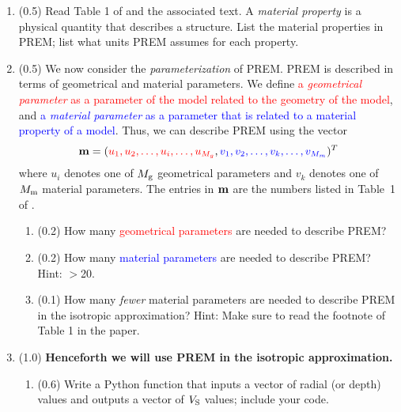 \documentclass[11pt,titlepage,fleqn]{article}
\begin{document}
\begin{enumerate}

\item (0.5) Read Table 1 of \citet{PREM} and the associated text. A {\em material property} is a physical quantity that describes a structure. List the material properties in PREM; list what units PREM assumes for each property.


\item (0.5) We now consider the {\em parameterization} of PREM. PREM is described in terms of geometrical and material parameters.
We define \textcolor{red}{a {\em geometrical parameter} as a parameter of the model related to the geometry of the model},
and \textcolor{blue}{a {\em material parameter} as a parameter that is related to a material property of a model}.
Thus, we can describe PREM using the vector
%
\begin{equation}
\mbox{${\bf m}$} = (\textcolor{red}{u_1, u_2, \ldots, u_i, \ldots, u_{M_g}},
\textcolor{blue}{v_1, v_2, \ldots, v_k, \ldots, v_{M_m}})^T
\label{bem}
\end{equation}
%
where $u_i$ denotes one of $M_{\rm g}$ geometrical parameters and $v_k$ denotes one of $M_{\rm m}$ material parameters.
The entries in $\mbox{${\bf m}$}$ are the numbers listed in Table~1 of \citet{PREM}.

\begin{enumerate}
\item (0.2) How many \textcolor{red}{geometrical parameters} are needed to describe PREM?
\item (0.2) How many \textcolor{blue}{material parameters} are needed to describe PREM? Hint: $>$20.
\item (0.1) How many {\em fewer} material parameters are needed to describe PREM in the isotropic approximation? Hint: Make sure to read the footnote of Table 1 in the paper.
\end{enumerate}



\item (1.0) {\bf Henceforth we will use PREM in the isotropic approximation.}


\begin{enumerate}
\item (0.6) Write a Python function that inputs a vector of radial (or depth) values and outputs a vector of $V_{\rm S}$ values; include your code.


\end{enumerate}
\end{enumerate}
\end{document}
